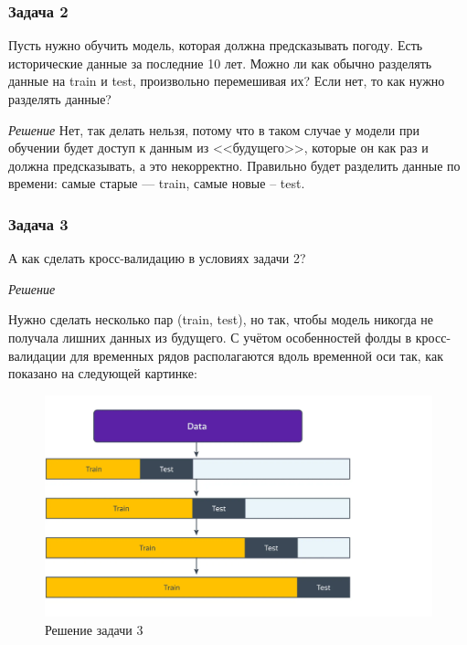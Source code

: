 \subsubsection{Задача 2}

Пусть нужно обучить модель, которая должна предсказывать погоду. Есть исторические данные за последние 10 лет. Можно ли как обычно разделять данные на train и test, произвольно перемешивая их? Если нет, то как нужно разделять данные?

\textit{Решение}
Нет, так делать нельзя, потому что в таком случае у модели при обучении будет доступ к данным из <<будущего>>, которые он как раз и должна предсказывать, а это некорректно. Правильно будет разделить данные по времени: самые старые --- train, самые новые -- test.

\subsubsection{Задача 3}

А как сделать кросс-валидацию в условиях задачи 2?

\textit{Решение}

Нужно сделать несколько пар (train, test), но так, чтобы модель никогда не получала лишних данных из будущего. С учётом особенностей фолды в кросс-валидации для временных рядов располагаются вдоль временной оси так, как показано на следующей картинке:

\begin{figure}[h]
	\centering
	\includegraphics[width=\textwidth/2]{sol-3.png}
	\caption{Решение задачи 3}
	\label{img:sol-3}
\end{figure}








